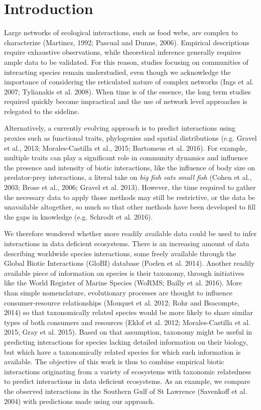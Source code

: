 \documentclass[letterpaper]{article}
\begin{document}
\section{Introduction}
Large networks of ecological interactions, such as food webs, are complex to characterize (Martinez, 1992; Pascual and Dunne, 2006). Empirical descriptions require exhaustive observations, while theoretical inference generally requires ample data to be validated. For this reason, studies focusing on communities of interacting species remain understudied, even though we acknowledge the importance of considering the reticulated nature of complex networks (Ings et al. 2007; Tylianakis et al. 2008). When time is of the essence, the long term studies required quickly become impractical and the use of network level approaches is relegated to the sideline.

Alternatively, a currently evolving approach is to predict interactions using proxies such as functional traits, phylogenies and spatial distributions (e.g. Gravel et al., 2013; Morales-Castilla et al., 2015; Bartomeus et al. 2016). For example, multiple traits can play a significant role in community dynamics and influence the presence and intensity of biotic interactions, like the influence of body size on predator-prey interactions, a literal take on \textit{big fish eats small fish} (Cohen et al., 2003; Brose et al., 2006; Gravel et al. 2013). However, the time required to gather the necessary data to apply those methods may still be restrictive, or the data be unavailable altogether, so much so that other methods have been developed to fill the gaps in knowledge (e.g. Schrodt et al. 2016).

We therefore wondered whether more readily available data could be used to infer interactions in data deficient ecosystems. There is an increasing amount of data describing worldwide species interactions, some freely available through the Global Biotic Interactions (GloBI) database (Poelen et al. 2014). Another readily available piece of information on species is their taxonomy, through initiatives like the World Register of Marine Species (WoRMS; Bailly et al. 2016). More than simple nomenclature, evolutionary processes are thought to influence consumer-resource relationships (Mouquet et al. 2012; Rohr and Bsacompte, 2014) so that taxonomically related species would be more likely to share similar types of both consumers and resources (Eklof et al. 2012; Morales-Castilla et al. 2015; Gray et al. 2015). Based on that assumption, taxonomy might be useful in predicting interactions for species lacking detailed information on their biology, but which have a taxonomically related species for which such information is available. The objective of this work is thus to combine empirical biotic interactions originating from a variety of ecosystems with taxonomic relatedness to predict interactions in data deficient ecosystems. As an example, we compare the observed interactions in the Southern Gulf of St Lawrence (Savenkoff et al. 2004) with predictions made using our approach.
\end{document}
